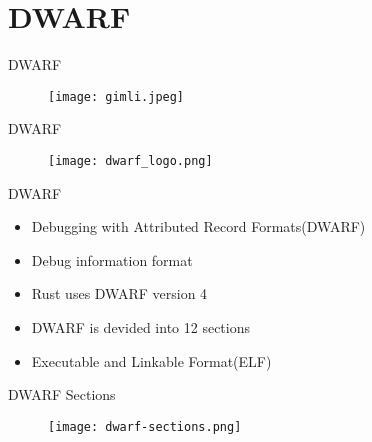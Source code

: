 \section{DWARF}

\begin{frame}{DWARF}
	\begin{figure}
		\texttt{[image: gimli.jpeg]}
	\end{figure}
\end{frame}


\begin{frame}{DWARF}
	\begin{figure}
		\texttt{[image: dwarf\_logo.png]}
	\end{figure}
\end{frame}


\begin{frame}{DWARF}
    \begin{itemize}
	    \item Debugging with Attributed Record Formats(DWARF)
	    \item Debug information format
	    \item Rust uses DWARF version 4
	    \item DWARF is devided into 12 sections
	    \item Executable and Linkable Format(ELF)
    \end{itemize}
\end{frame}


\begin{frame}{DWARF Sections}
	\begin{figure}
		\texttt{[image: dwarf-sections.png]}
	\end{figure}
\end{frame}

